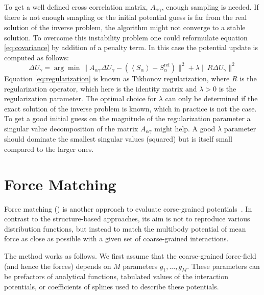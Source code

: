 To get a well defined cross correlation matrix, $A_{\alpha \gamma}$, enough sampling is needed. If there is not enough smapling or the initial potential guess is far from the real solution of the inverse problem, the algorithm might not converge to a stable solution. To overcome this instability problem one could reformulate equation \ref{eq:covariance} by addition of a penalty term. In this case the potential update is computed  as follows:\cite{Murtola:2007}
\begin{equation}
\label{eq:regularization}
\Delta U_\gamma = \arg \min \| A_{\alpha \gamma} \Delta U_\gamma - \left(\left<S_{\alpha}\right> - S_{\alpha}^{\text{ref}}\right) \|^2 + \lambda \| R \Delta U_{\gamma} \|^{2}
\end{equation}
%
Equation \ref{eq:regularization} is known as Tikhonov regularization,
where $R$ is the regularization operator, which here is the identity matrix and $\lambda >0 $ is the regularization parameter.
The optimal choice for $\lambda$ can only be determined if the exact solution of the inverse problem is known, which in practice is not the case. To get a good initial guess on the magnitude of the regularization parameter a singular value decomposition of the matrix $A_{\alpha \gamma}$ might help. A good $\lambda$ parameter should dominate the smallest singular values (squared) but is itself small compared to the larger ones.\cite{Rosenberger:2016}
 
\section{Force Matching}
\label{sec:fm}



Force matching (\fm) is another approach to evaluate corse-grained potentials~\cite{Ercolessi:1994,Izvekov:2005,Noid:2007}. In contrast to the structure-based approaches, its aim is not to reproduce various distribution functions, but instead to match the multibody potential of mean force as close as possible with a given set of coarse-grained interactions.

The method works as follows. We first assume that the coarse-grained force-field (and hence the forces) depends on $M$ parameters $g_1,...,g_M $. These parameters can be prefactors of analytical functions, tabulated values of the interaction potentials, or coefficients of splines used to describe these potentials.

